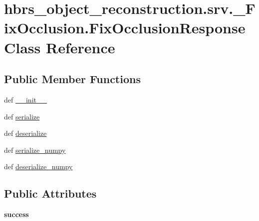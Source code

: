 \hypertarget{classhbrs__object__reconstruction_1_1srv_1_1___fix_occlusion_1_1_fix_occlusion_response}{\section{hbrs\-\_\-object\-\_\-reconstruction.\-srv.\-\_\-\-Fix\-Occlusion.\-Fix\-Occlusion\-Response \-Class \-Reference}
\label{classhbrs__object__reconstruction_1_1srv_1_1___fix_occlusion_1_1_fix_occlusion_response}
}
\subsection*{\-Public \-Member \-Functions}
\begin{DoxyCompactItemize}
\item 
def \hyperlink{classhbrs__object__reconstruction_1_1srv_1_1___fix_occlusion_1_1_fix_occlusion_response_a88d96783ab4d301e81d9a8846922fe16}{\-\_\-\-\_\-init\-\_\-\-\_\-}
\item 
def \hyperlink{classhbrs__object__reconstruction_1_1srv_1_1___fix_occlusion_1_1_fix_occlusion_response_a5121d16439e96b5ab587da8abdb3126b}{serialize}
\item 
def \hyperlink{classhbrs__object__reconstruction_1_1srv_1_1___fix_occlusion_1_1_fix_occlusion_response_a5ac22047031f0b87c9763559af9a1040}{deserialize}
\item 
def \hyperlink{classhbrs__object__reconstruction_1_1srv_1_1___fix_occlusion_1_1_fix_occlusion_response_a2216a3c031c664cf516b26521e6e54f2}{serialize\-\_\-numpy}
\item 
def \hyperlink{classhbrs__object__reconstruction_1_1srv_1_1___fix_occlusion_1_1_fix_occlusion_response_a0e1eacbcd79671719b15021e29c67936}{deserialize\-\_\-numpy}
\end{DoxyCompactItemize}
\subsection*{\-Public \-Attributes}
\begin{DoxyCompactItemize}
\item 
\hypertarget{classhbrs__object__reconstruction_1_1srv_1_1___fix_occlusion_1_1_fix_occlusion_response_a440ad61396277551c4f88a93eb92373a}{{\bfseries success}}\label{classhbrs__object__reconstruction_1_1srv_1_1___fix_occlusion_1_1_fix_occlusion_response_a440ad61396277551c4f88a93eb92373a}

\end{DoxyCompactItemize}


